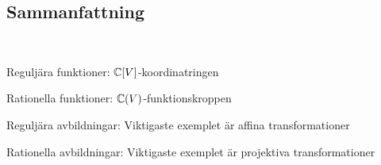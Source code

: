 \subsection{Sammanfattning}\hfill\\\par
\noindent Reguljära funktioner: $\mathbb{C}[V]$-koordinatringen \par
\noindent Rationella funktioner: $\mathbb{C}(V)$-funktionskroppen\par
\noindent Reguljära avbildningar: Viktigaste exemplet är affina transformationer\par
\noindent Rationella avbildningar: Viktigaste exemplet är projektiva transformationer
